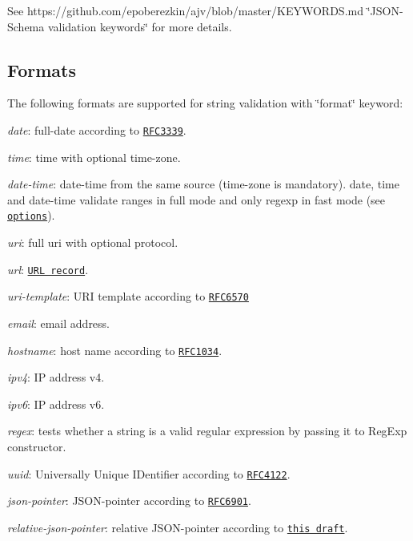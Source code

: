See https\+://github.com/epoberezkin/ajv/blob/master/\+K\+E\+Y\+W\+O\+R\+D\+S.\+md \char`\"{}\+J\+S\+O\+N-\/\+Schema validation keywords\char`\"{} for more details.

\subsection*{Formats}

The following formats are supported for string validation with \char`\"{}format\char`\"{} keyword\+:


\begin{DoxyItemize}
\item {\itshape date}\+: full-\/date according to \href{http://tools.ietf.org/html/rfc3339#section-5.6}{\tt R\+F\+C3339}.
\item {\itshape time}\+: time with optional time-\/zone.
\item {\itshape date-\/time}\+: date-\/time from the same source (time-\/zone is mandatory). {\ttfamily date}, {\ttfamily time} and {\ttfamily date-\/time} validate ranges in {\ttfamily full} mode and only regexp in {\ttfamily fast} mode (see \href{#options}{\tt options}).
\item {\itshape uri}\+: full uri with optional protocol.
\item {\itshape url}\+: \href{https://url.spec.whatwg.org/#concept-url}{\tt U\+RL record}.
\item {\itshape uri-\/template}\+: U\+RI template according to \href{https://tools.ietf.org/html/rfc6570}{\tt R\+F\+C6570}
\item {\itshape email}\+: email address.
\item {\itshape hostname}\+: host name according to \href{http://tools.ietf.org/html/rfc1034#section-3.5}{\tt R\+F\+C1034}.
\item {\itshape ipv4}\+: IP address v4.
\item {\itshape ipv6}\+: IP address v6.
\item {\itshape regex}\+: tests whether a string is a valid regular expression by passing it to Reg\+Exp constructor.
\item {\itshape uuid}\+: Universally Unique I\+Dentifier according to \href{http://tools.ietf.org/html/rfc4122}{\tt R\+F\+C4122}.
\item {\itshape json-\/pointer}\+: J\+S\+O\+N-\/pointer according to \href{https://tools.ietf.org/html/rfc6901}{\tt R\+F\+C6901}.
\item {\itshape relative-\/json-\/pointer}\+: relative J\+S\+O\+N-\/pointer according to \href{http://tools.ietf.org/html/draft-luff-relative-json-pointer-00}{\tt this draft}.
\end{DoxyItemize}

